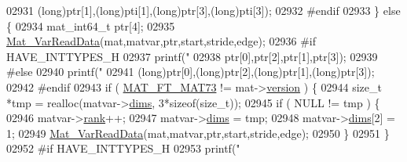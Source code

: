 \begin{DoxyCode}
{{{{{{{{{{{{{{{{{{{{{{02931                             (\textcolor{keywordtype}{long})ptr[1],(\textcolor{keywordtype}{long})pti[1],(\textcolor{keywordtype}{long})ptr[3],(\textcolor{keywordtype}{long})pti[3]);
02932 \textcolor{preprocessor}{#endif}
02933                     \} \textcolor{keywordflow}{else} \{
02934                         mat\_int64\_t ptr[4];
02935                         \hyperlink{group___m_a_t_ga1845000f4fc6252ec5ff11c4b9f0759f}{Mat\_VarReadData}(mat,matvar,ptr,start,stride,edge);
02936 \textcolor{preprocessor}{#if HAVE\_INTTYPES\_H}
02937                         printf(\textcolor{stringliteral}{"%
02938                             ptr[0],ptr[2],ptr[1],ptr[3]);
02939 \textcolor{preprocessor}{#else}
02940                         printf(\textcolor{stringliteral}{"%
02941                             (\textcolor{keywordtype}{long})ptr[0],(\textcolor{keywordtype}{long})ptr[2],(\textcolor{keywordtype}{long})ptr[1],(\textcolor{keywordtype}{long})ptr[3]);
02942 \textcolor{preprocessor}{#endif}
02943                         \textcolor{keywordflow}{if} ( \hyperlink{group___m_a_t_ggad03442b8378999189d510e3745c702b7a765c5d1d5038947646260dc82483517e}{MAT\_FT\_MAT73} != mat->\hyperlink{struct__mat__t_a729c2bc0afc97485057a5af425635b1a}{version} ) \{
02944                             \textcolor{keywordtype}{size\_t} *tmp = realloc(matvar->\hyperlink{group___m_a_t_a8e01234e1c862ce3472bb37f5a09b92c}{dims}, 3*\textcolor{keyword}{sizeof}(\textcolor{keywordtype}{size\_t}));
02945                             \textcolor{keywordflow}{if} ( NULL != tmp ) \{
02946                                 matvar->\hyperlink{group___m_a_t_a84ba70c96ded13cc555fa75b768d9921}{rank}++;
02947                                 matvar->\hyperlink{group___m_a_t_a8e01234e1c862ce3472bb37f5a09b92c}{dims} = tmp;
02948                                 matvar->\hyperlink{group___m_a_t_a8e01234e1c862ce3472bb37f5a09b92c}{dims}[2] = 1;
02949                                 \hyperlink{group___m_a_t_ga1845000f4fc6252ec5ff11c4b9f0759f}{Mat\_VarReadData}(mat,matvar,ptr,start,stride,edge);
02950                             \}
02951                         \}
02952 \textcolor{preprocessor}{#if HAVE\_INTTYPES\_H}
02953                         printf(\textcolor{stringliteral}{"%
}}}}}}}}}}}}}}}}}}}}}}}}}
\end{DoxyCode}
